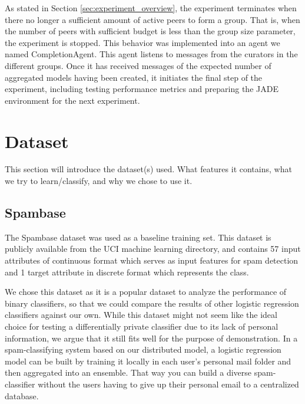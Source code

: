 As stated in Section \ref{sec:experiment_overview},  the experiment terminates when there no longer a sufficient amount of active peers to form a group. That is, when the number of peers with sufficient budget is less than the group size parameter, the experiment is stopped. This behavior was implemented into an agent we named CompletionAgent. This agent listens to messages from the curators in the different groups. Once it has received messages of the expected number of aggregated models having been created, it initiates the final step of the experiment, including testing performance metrics and preparing the JADE environment for the next experiment. 


\section{Dataset}
This section will introduce the dataset(s) used. What features it contains, what we try to learn/classify, and why we chose to use it.

\subsection{Spambase} \label{sec:spambase}
The Spambase dataset \cite{spambase1999data} was used as a baseline training set. This dataset is publicly available from the UCI machine learning directory, and contains 57 input attributes of continuous format which serves as input features for spam detection and 1 target attribute in discrete format which represents the class.

We chose this dataset as it is a popular dataset to analyze the performance of binary classifiers, so that we could compare the results of other logistic regression classifiers against our own. While this dataset might not seem like the ideal choice for testing a differentially private classifier due to its lack of personal information, we argue that it still fits well for the purpose of demonstration. In a spam-classifying system based on our distributed model, a logistic regression model can be built by training it locally in each user's personal mail folder and then aggregated into an ensemble. That way you can build a diverse spam-classifier without the users having to give up their personal email to a centralized database.     

